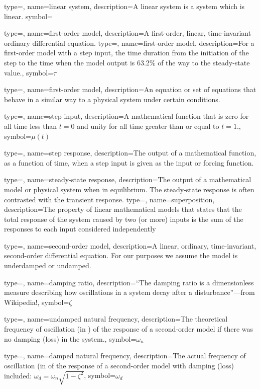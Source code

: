 
{type=\thisgls,
name={linear system},
description={A linear system is a system which is linear.}
symbol={}
}

{
type=\thisgls,
name={first-order model},
description={A first-order, linear, time-invariant ordinary differential equation.}
}
{
type=\thisgls,
name={first-order model},
description={For a first-order model with a step input, the time duration from the initiation of the step to the time when the model output is 63.2\% of the way to the steady-state value.},
symbol={\ensuremath{\tau}}
}

{
type=\thisgls,
name={first-order model},
description={An equation or set of equations that behave in a similar way to a physical system under certain conditions.}
}

{
type=\thisgls,
name={step input},
description={A mathematical function that is zero for all time less than $t=0$ and unity for all time greater than or equal to $t=1$.},
symbol={\ensuremath{\mu(t)}}
}

{
type=\thisgls,
name={step response},
description={The output of a mathematical function, as a function of time, when a step input is given as the input or forcing function.}
}

{
type=\thisgls,
name={steady-state response},
description={The output of a mathematical model or physical system when in equilibrium.  The steady-state response is often contrasted with the transient response.}
}
{
type=\thisgls,
name={superposition},
description={The property of linear mathematical models that states that the total response of the system caused by two (or more) inputs is the sum of the responses to each input considered independently}
}

{
type=\thisgls,
name={second-order model},
description={A linear, ordinary, time-invariant, second-order differential equation.  For our purposes we assume the model is underdamped or undamped.}
}

{
type=\thisgls,
name={damping ratio},
description={``The damping ratio is a dimensionless measure describing how oscillations in a system decay after a disturbance''---from Wikipedia!},
symbol={$\zeta$}
}

{
type=\thisgls,
name={undamped natural frequency},
description={The theoretical frequency of oscillation (in ) of the response of a second-order model if there was no damping (loss) in the system.},
symbol={$\omega_n$}
}

{
type=\thisgls,
name={damped natural frequency},
description={The actual frequency of oscillation (in  of the response of a second-order model with damping (loss) included: $\omega_d = \omega_n \sqrt{1-\zeta^2}$},
symbol={$\omega_d$}
}
